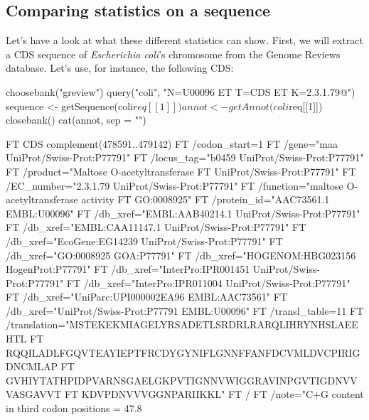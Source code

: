 \documentclass{article}
\begin{document}
\subsection{Comparing statistics on a sequence}

Let's have a look at what these different statistics can show. First,
we will extract a CDS sequence of \textit{Escherichia coli}'s
chromosome from the Genome Reviews database. Let's use, for instance, 
the following CDS:

\begin{Schunk}
\begin{Sinput}
 choosebank("greview")
 query("coli", "N=U00096 ET T=CDS ET K=2.3.1.79@")
 sequence <- getSequence(coli$req[[1]])
 annot <- getAnnot(coli$req[[1]])
 closebank()
 cat(annot, sep = "\n")
\end{Sinput}
\begin{Soutput}
FT   CDS             complement(478591..479142)
FT                   /codon_start=1
FT                   /gene="maa {UniProt/Swiss-Prot:P77791}"
FT                   /locus_tag="b0459 {UniProt/Swiss-Prot:P77791}"
FT                   /product="Maltose O-acetyltransferase
FT                   {UniProt/Swiss-Prot:P77791}"
FT                   /EC_number="2.3.1.79 {UniProt/Swiss-Prot:P77791}"
FT                   /function="maltose O-acetyltransferase activity
FT                   {GO:0008925}"
FT                   /protein_id="AAC73561.1 {EMBL:U00096}"
FT                   /db_xref="EMBL:AAB40214.1 {UniProt/Swiss-Prot:P77791}"
FT                   /db_xref="EMBL:CAA11147.1 {UniProt/Swiss-Prot:P77791}"
FT                   /db_xref="EcoGene:EG14239 {UniProt/Swiss-Prot:P77791}"
FT                   /db_xref="GO:0008925 {GOA:P77791}"
FT                   /db_xref="HOGENOM:HBG023156 {HogenProt:P77791}"
FT                   /db_xref="InterPro:IPR001451 {UniProt/Swiss-Prot:P77791}"
FT                   /db_xref="InterPro:IPR011004 {UniProt/Swiss-Prot:P77791}"
FT                   /db_xref="UniParc:UPI000002EA96 {EMBL:AAC73561}"
FT                   /db_xref="UniProt/Swiss-Prot:P77791 {EMBL:U00096}"
FT                   /transl_table=11
FT                   /translation="MSTEKEKMIAGELYRSADETLSRDRLRARQLIHRYNHSLAEEHTL
FT                   RQQILADLFGQVTEAYIEPTFRCDYGYNIFLGNNFFANFDCVMLDVCPIRIGDNCMLAP
FT                   GVHIYTATHPIDPVARNSGAELGKPVTIGNNVWIGGRAVINPGVTIGDNVVVASGAVVT
FT                   KDVPDNVVVGGNPARIIKKL"
FT                   /%
FT                   /note="C+G content in third codon positions = 47.8 %
\end{Soutput}
\end{Schunk}
\end{document}

